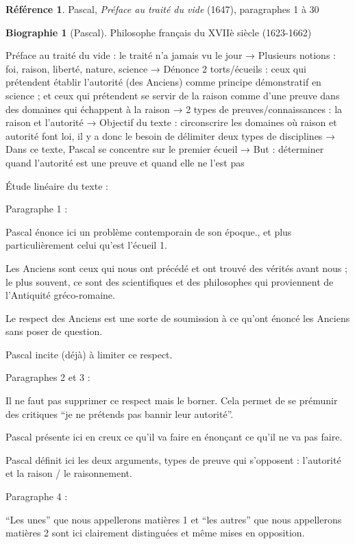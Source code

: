 \documentclass[french]{book}
\theoremstyle{definition}
\newtheorem*{refe}{Référence}
\newtheorem*{bio}{Biographie}
\begin{document}
\begin{refe}
	Pascal, \textit{Préface au traité du vide }(1647), paragraphes 1 à 30 
\end{refe}

\begin{bio}[Pascal]
	Philosophe français du XVIIè siècle (1623-1662)
\end{bio}

Préface au traité du vide : le traité n’a jamais vu le jour
→ Plusieurs notions : foi, raison, liberté, nature, science
→ Dénonce 2 torts/écueils : ceux qui prétendent établir l’autorité (des Anciens) comme principe démonstratif en science ; et ceux qui prétendent se servir de la raison comme d’une preuve dans des domaines qui échappent à la raison
→ 2 types de preuves/connaissances : la raison et l’autorité
→ Objectif du texte : circonscrire les domaines où raison et autorité font loi, il y a donc le besoin de délimiter deux types de disciplines
→ Dans ce texte, Pascal se concentre sur le premier écueil
→ But : déterminer quand l’autorité est une preuve et quand elle ne l’est pas

Étude linéaire du texte :

Paragraphe 1 :

Pascal énonce ici un problème contemporain de son époque., et plus particulièrement celui qu’est l’écueil 1.

Les Anciens sont ceux qui nous ont précédé et ont trouvé des vérités avant nous ; le plus souvent, ce sont des scientifiques et des philosophes qui proviennent de l’Antiquité gréco-romaine.

Le respect des Anciens est une sorte de soumission à ce qu’ont énoncé les Anciens sans poser de question.

Pascal incite (déjà) à limiter ce respect.

Paragraphes 2 et 3 :

Il ne faut pas supprimer ce respect mais le borner. Cela permet de se prémunir des critiques “je ne prétends pas bannir leur autorité”. 

Pascal présente ici en creux ce qu’il va faire en énonçant ce qu’il ne va pas faire.

Pascal définit ici les deux arguments, types de preuve qui s’opposent : l’autorité et la raison / le raisonnement.

Paragraphe 4 :

“Les unes” que nous appellerons matières 1  et “les autres” que nous appellerons matières 2 sont ici clairement distinguées et même mises en opposition.
\end{document}
